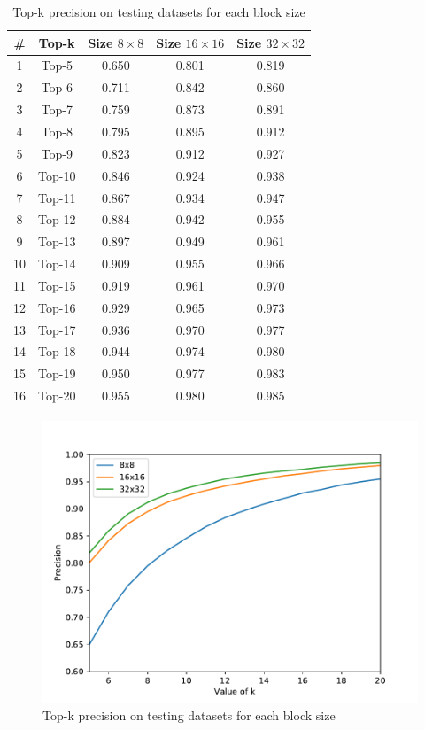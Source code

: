 \begin{table}
    \caption{Top-k precision on testing datasets for each block size}
    \bigskip\label{tab:valprecision}
    \centering
    \begin{tabular}{c c c c c}
        \toprule
        \# & Top-k & Size \(8\times8\) & Size \(16\times16\) & Size \(32\times32\) \\
        \midrule
        1 & Top-5 & 0.650     & 0.801  & 0.819 \\
        2 & Top-6  & 0.711    & 0.842  & 0.860 \\
        3 & Top-7  & 0.759    & 0.873  & 0.891 \\
        4 & Top-8  & 0.795    & 0.895  & 0.912 \\
        5 & Top-9  & 0.823    & 0.912  & 0.927 \\
        6 & Top-10  & 0.846   & 0.924   & 0.938 \\
        7 & Top-11  & 0.867   & 0.934   & 0.947 \\
        8 & Top-12  & 0.884   & 0.942   & 0.955 \\
        9 & Top-13  & 0.897   & 0.949   & 0.961 \\
        10 & Top-14  & 0.909  & 0.955   & 0.966 \\
        11 & Top-15  & 0.919  & 0.961   & 0.970 \\
        12 & Top-16  & 0.929  & 0.965   & 0.973 \\
        13 & Top-17  & 0.936  & 0.970   & 0.977 \\
        14 & Top-18  & 0.944  & 0.974   & 0.980 \\
        15 & Top-19  & 0.950  & 0.977   & 0.983 \\
        16 & Top-20  & 0.955  & 0.980   & 0.985 \\
        \bottomrule
    \end{tabular}
\end{table}

\begin{figure}
    \centering
    \includegraphics[width=\textwidth,height=\textheight,keepaspectratio]{Figures/topkPrecisions.pdf}
    \caption[Top-k precision on testing datasets for each block size]
    {Top-k precision on testing datasets for each block size}\label{fig:topkPrecisions}
\end{figure}
